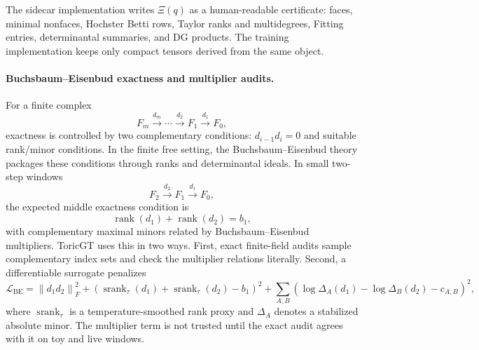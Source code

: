 \documentclass[11pt]{article}
\theoremstyle{definition}
\theoremstyle{plain}
\theoremstyle{remark}
\numberwithin{equation}{section}
\newcommand{\rank}{\operatorname{rank}}
\newcommand{\norm}[1]{\left\lVert #1\right\rVert}
\begin{document}
The sidecar implementation writes $\Xi(q)$ as a human-readable certificate: faces, minimal nonfaces, Hochster Betti rows, Taylor ranks and multidegrees, Fitting entries, determinantal summaries, and DG products.  The training implementation keeps only compact tensors derived from the same object.

\paragraph{Buchsbaum--Eisenbud exactness and multiplier audits.}
For a finite complex
\begin{equation}
  F_m\xrightarrow{d_m}\cdots\xrightarrow{d_2}F_1\xrightarrow{d_1}F_0,
\end{equation}
exactness is controlled by two complementary conditions: $d_{i-1}d_i=0$ and suitable rank/minor conditions.  In the finite free setting, the Buchsbaum--Eisenbud theory packages these conditions through ranks and determinantal ideals.  In small two-step windows
\begin{equation}
  F_2\xrightarrow{d_2}F_1\xrightarrow{d_1}F_0,
\end{equation}
the expected middle exactness condition is
\begin{equation}
  \rank(d_1)+\rank(d_2)=b_1,
\end{equation}
with complementary maximal minors related by Buchsbaum--Eisenbud multipliers.  ToricGT uses this in two ways.  First, exact finite-field audits sample complementary index sets and check the multiplier relations literally.  Second, a differentiable surrogate penalizes
\begin{equation}
  \mathcal L_{\mathrm{BE}}
  =
  \norm{d_1d_2}_F^2+
  \left(\operatorname{srank}_\tau(d_1)+\operatorname{srank}_\tau(d_2)-b_1\right)^2+
  \sum_{A,B}\left(\log\Delta_A(d_1)-\log\Delta_B(d_2)-c_{A,B}\right)^2,
\end{equation}
where $\operatorname{srank}_\tau$ is a temperature-smoothed rank proxy and $\Delta_A$ denotes a stabilized absolute minor.  The multiplier term is not trusted until the exact audit agrees with it on toy and live windows.
\end{document}

